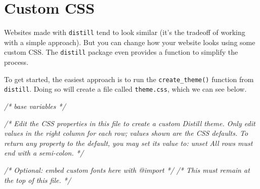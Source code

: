 \documentclass[
]{book}
\newenvironment{Shaded}{\begin{snugshade}}{\end{snugshade}}
\newcommand{\CommentTok}[1]{\textcolor[rgb]{0.56,0.35,0.01}{\textit{#1}}}
\begin{document}
\hypertarget{custom-css}{%
\section*{Custom CSS}\label{custom-css}}

Websites made with \texttt{distill} tend to look similar (it's the tradeoff of working with a simple approach). But you can change how your website looks using some custom CSS. The \texttt{distill} package even provides a function to simplify the process.

To get started, the easiest approach is to run the \texttt{create\_theme()} function from \texttt{distill}. Doing so will create a file called \texttt{theme.css}, which we can see below.

\begin{Shaded}
\begin{Highlighting}[]
\CommentTok{/* base variables */}

\CommentTok{/* Edit the CSS properties in this file to create a custom}
\CommentTok{   Distill theme. Only edit values in the right column}
\CommentTok{   for each row; values shown are the CSS defaults.}
\CommentTok{   To return any property to the default,}
\CommentTok{   you may set its value to: unset}
\CommentTok{   All rows must end with a semi{-}colon.                      */}

\CommentTok{/* Optional: embed custom fonts here with \textasciigrave{}@import\textasciigrave{}          */}
\CommentTok{/* This must remain at the top of this file.                 */}


\end{Highlighting}
\end{Shaded}
\end{document}
